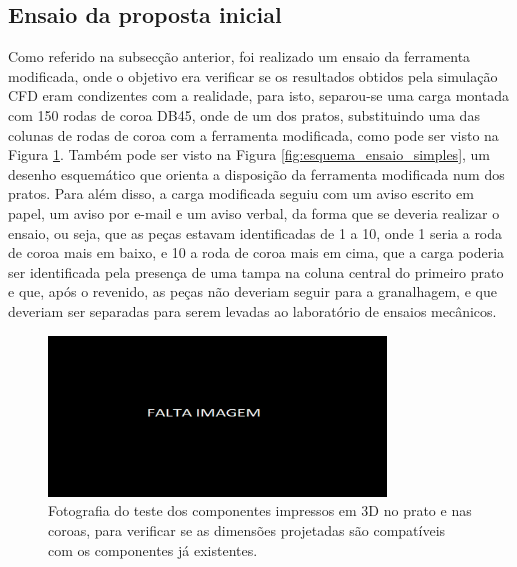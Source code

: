 \subsection{Ensaio da proposta inicial} \label{ssec:materiais_ensaio_simples}
Como referido na subsecção anterior, foi realizado um ensaio da ferramenta modificada, onde o objetivo era verificar se os resultados obtidos pela simulação CFD eram condizentes com a realidade, para isto, separou-se uma carga montada com 150 rodas de coroa DB45, onde de um dos pratos, substituindo uma das colunas de rodas de coroa com a ferramenta modificada, como pode ser visto na Figura \ref{fig:ensaio_simples}. Também pode ser visto na Figura \ref{fig:esquema_ensaio_simples}, um desenho esquemático que orienta a disposição da ferramenta modificada num dos pratos. Para além disso, a carga modificada seguiu com um aviso escrito em papel, um aviso por e-mail e um aviso verbal, da forma que se deveria realizar o ensaio, ou seja, que as peças estavam identificadas de 1 a 10, onde 1 seria a roda de coroa mais em baixo, e 10 a roda de coroa mais em cima, que a carga poderia ser identificada pela presença de uma tampa na coluna central do primeiro prato e que, após o revenido, as peças não deveriam seguir para a granalhagem, e que deveriam ser separadas para serem levadas ao laboratório de ensaios mecânicos.
\begin{figure}[htb]
    \centering
    \includegraphics[width = 0.8\textwidth]{Figures/Cap3/Falta_imagem_larga.png}
    \caption[Teste dos componentes impressos em 3D no prato e nas coroas]%
    {Fotografia do teste dos componentes impressos em 3D no prato e nas coroas, para verificar se as dimensões projetadas são compatíveis com os componentes já existentes.}
    \label{fig:ensaio_simples}
\end{figure}
